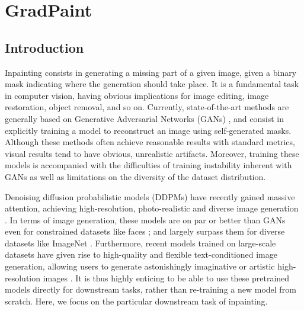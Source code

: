 \chapter{GradPaint}
\label{chapter:gradpaint}

    


\minitoc
{} 


\section{Introduction}

Inpainting consists in generating a missing part of a given image, given a binary mask 
indicating where the generation should take place. It is a fundamental task in computer
 vision, having obvious implications for image editing, image restoration, object 
 removal, and so on. Currently, state-of-the-art methods are generally based on 
 Generative Adversarial Networks (GANs) \cite{lama, zhao2021comodgan}, and consist 
 in explicitly training a model to reconstruct an image using self-generated masks.
  Although these methods often achieve reasonable results with standard metrics, 
  visual results tend to have obvious, unrealistic artifacts. Moreover, training 
  these models is accompanied with the difficulties of training instability inherent 
  with GANs as well as limitations on the diversity of the dataset distribution. 

Denoising diffusion probabilistic models (DDPMs) have recently gained massive attention,
 achieving high-resolution, photo-realistic and diverse image generation 
 \citep{dalle2, imagen, latentdiffusion, latentdiffusion2, guided-diffusion, glide}. In 
 terms of image generation, these models are on par or better than GANs even for 
 constrained datasets like faces \cite{latentdiffusion}; and largely surpass them for 
 diverse datasets like ImageNet \cite{glide, latentdiffusion}. Furthermore, 
 recent models trained on large-scale datasets 
 \cite{imagen, dalle2, glide, makeascene, latentdiffusion} have given rise to 
 high-quality and flexible text-conditioned image generation, allowing users to 
 generate astonishingly imaginative or artistic high-resolution images \cite{artcomp}. 
 It is thus highly enticing to be able to use these pretrained models directly for
  downstream tasks, rather than re-training a new model from scratch. Here, we focus 
  on the particular downstream task of inpainting.

